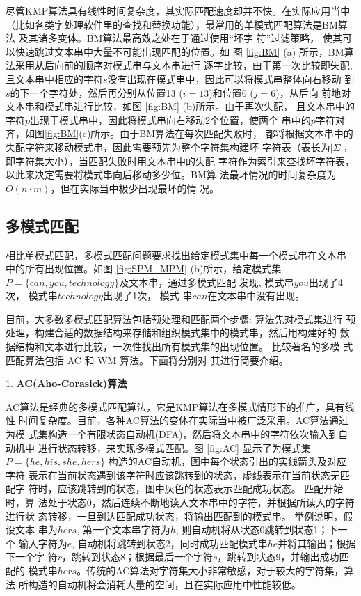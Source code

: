 尽管KMP算法具有线性时间复杂度，其实际匹配速度却并不快。在实际应用当中
（比如各类字处理软件里的查找和替换功能），最常用的单模式匹配算法是BM算
法 \cite{Boyer1977} 及其诸多变体。BM算法最高效之处在于通过使用“坏字
符”过滤策略， 使其可以快速跳过文本串中大量不可能出现匹配的位置。如
图 \ref{fig:BM} (a) 所示，BM算法采用从后向前的顺序对模式串与文本串进行
逐字比较，由于第一次比较即失配,
且文本串中相应的字符$s$没有出现在模式串中，因此可以将模式串整体向右移动
到$s$的下一个字符处，然后再分别从位置13 ($i=13$)和位置6 ($j=6$)，从后向
前地对文本串和模式串进行比较，如图 \ref{fig:BM} (b)所示。由于再次失配，
且文本串中的字符$p$出现于模式串中，因此将模式串向右移动2个位置，使两个
串中的$p$字符对齐，如图\ref{fig:BM}(c)所示。由于BM算法在每次匹配失败时，
都将根据文本串中的失配字符来移动模式串，因此需要预先为整个字符集构建坏
字符表（表长为$|\Sigma|$，即字符集大小），当匹配失败时用文本串中的失配
字符作为索引来查找坏字符表，以此来决定需要将模式串向后移动多少位。BM算
法最坏情况的时间复杂度为$O(n \cdot m)$，但在实际当中极少出现最坏的情
况。

\subsection{多模式匹配}

相比单模式匹配，多模式匹配问题要求找出给定模式集中每一个模式串在文本串
中的所有出现位置。如图 \ref{fig:SPM_MPM}
(b)所示，给定模式集$P=\{can, you, technology\}$及文本串，通过多模式匹配
发现, 模式串$you$出现了4次， 模式串$technology$出现了1次， 模式
串$can$在文本串中没有出现。

目前，大多数多模式匹配算法包括预处理和匹配两个步骤: 算法先对模式集进行
预处理，构建合适的数据结构来存储和组织模式集中的模式串，然后用构建好的
数据结构和文本进行比较，一次性找出所有模式集的出现位置。 比较著名的多模
式匹配算法包括 AC \cite{Aho1975} 和 WM \cite{Wu1994} 算法。下面将分别对
其进行简要介绍。

1. \textbf{AC(Aho-Corasick)算法}

AC算法是经典的多模式匹配算法，它是KMP算法在多模式情形下的推广，具有线性
时间复杂度。目前，各种AC算法的变体在实际当中被广泛采用。AC算法通过为模
式集构造一个有限状态自动机(DFA)，然后将文本串中的字符依次输入到自动机中
进行状态转移，来实现多模式匹配。图 \ref{fig:AC} 显示了为模式集$P=\{he,
his, she, hers\}$ 构造的AC自动机，图中每个状态引出的实线箭头及对应字符
表示在当前状态遇到该字符时应该跳转到的状态，虚线表示在当前状态无匹配字
符时，应该跳转到的状态，图中灰色的状态表示匹配成功状态。 匹配开始时，算
法处于状态0，然后连续不断地读入文本串中的字符，并根据所读入的字符进行状
态转移，一旦到达匹配成功状态，将输出匹配到的模式串。 举例说明，假设文本
串为$hers$, 第一个文本串字符为$h$, 则自动机将从状态0跳转到状态1；下一个
输入字符为$e$,
自动机将跳转到状态2，同时成功匹配模式串$he$并将其输出；根据下一个字
符$r$，跳转到状态8；根据最后一个字符$s$，跳转到状态9，并输出成功匹配的
模式串$hers$。传统的AC算法对字符集大小非常敏感，对于较大的字符集，算法
所构造的自动机将会消耗大量的空间，且在实际应用中性能较低。


